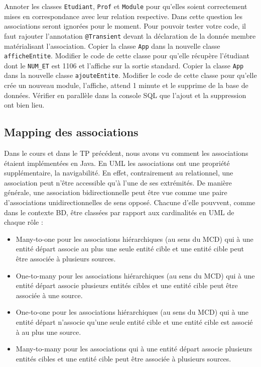 \documentclass[a4paper,11pt]{article}
\begin{document}
\Question Annoter les classes \texttt{Etudiant}, \texttt{Prof} et \texttt{Module} pour qu'elles soient correctement mises 
en correspondance avec leur relation respective. Dans cette question les associations seront ignorées pour le moment. 
Pour pouvoir tester votre code, il faut rajouter l'annotation \texttt{@Transient} devant la déclaration de la donnée 
membre matérialisant l'association.
\Question  Copier la classe \texttt{App} dans la nouvelle classe \texttt{afficheEntite}. Modifier le code de cette classe 
pour qu'elle récupère l'étudiant dont le \texttt{NUM\_ET} est 1106 et l'affiche sur la sortie standard. 
\Question  Copier la classe \texttt{App} dans la nouvelle classe \texttt{ajouteEntite}. Modifier le code de cette classe 
pour qu'elle crée un nouveau module, l'affiche, attend 1 minute et le supprime de la base de données. Vérifier en parallèle 
dans la console SQL que l'ajout et la suppression ont bien lieu.

\subsection{Mapping des associations}
Dans le cours et dans le TP précédent, nous avons vu comment les associations étaient implémentées en Java. En UML les 
associations ont une propriété supplémentaire, la navigabilité. En effet, contrairement au relationnel, une association
peut n'être accessible qu'à l'une de ses extrémités. De manière générale, une association bidirectionnelle peut être 
vue comme une paire d'associations unidirectionnelles de sens opposé. Chacune d'elle pouvvent, comme dans le contexte BD, être 
classées par rapport aux cardinalités en UML de chaque rôle :
\begin{itemize}
  \item Many-to-one pour les associations hiérarchiques (au sens du MCD) qui à une entité départ associe au plus une 
    seule entité cible et une entité cible peut être associée à plusieurs sources.   
  \item One-to-many pour les associations hiérarchiques (au sens du MCD) qui à une entité départ associe plusieurs 
    entités cibles et une entité cible peut être associée à une source.
  \item One-to-one pour les associations hiérarchiques (au sens du MCD) qui à une entité départ n'associe qu'une seule 
    entité cible et une entité cible est associé à au plus une source.
  \item Many-to-many pour les associations qui à une entité départ associe plusieurs entités cibles et une entité cible 
    peut être associée à plusieurs sources.
\end{itemize}
\end{document}
